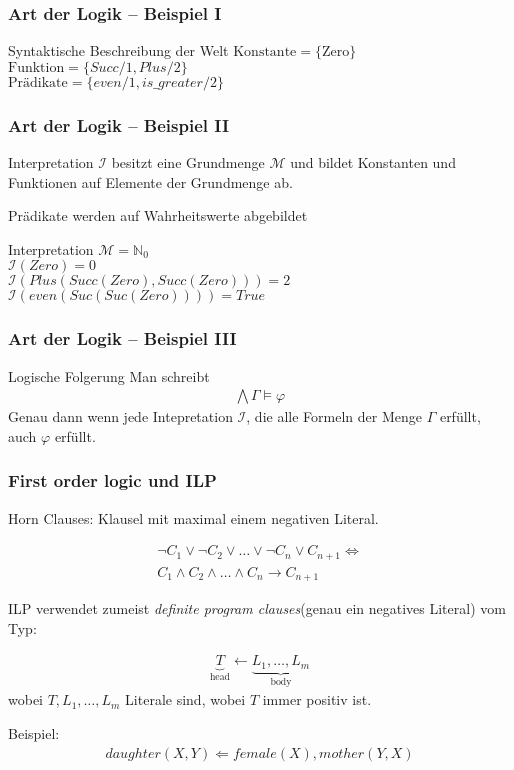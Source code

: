 \begin{frame}
	\frametitle{Art der Logik -- Beispiel I }

	\begin{block}{Syntaktische Beschreibung der Welt}
		$\text{Konstante} = \{\text{Zero}\}$\\
		$\text{Funktion} =\{Succ/1, Plus/2 \}$\\
		$\text{Prädikate} =\{even/1, is\_greater/2 \}$
	\end{block}

\end{frame}

\begin{frame}
	\frametitle{Art der Logik -- Beispiel II}
	Interpretation $\mathcal{I}$ besitzt eine Grundmenge $\mathcal{M}$
	und bildet Konstanten und Funktionen auf Elemente der Grundmenge ab.

	Prädikate werden auf Wahrheitswerte abgebildet

	\begin{block}{Interpretation}
			$\mathcal{M} = \mathbb{N}_0$\\
			$\mathcal{I}(Zero) = 0$\\
			$\mathcal{I}(Plus(Succ(Zero), Succ(Zero))) = 2$\\
			$\mathcal{I}(even(Suc(Suc(Zero)))) = True$
	\end{block}
\end{frame}

\begin{frame}
	\frametitle{Art der Logik -- Beispiel III}
	\begin{block}{Logische Folgerung}
		Man schreibt
		\begin{align*}
			 \bigwedge\Gamma \vDash \varphi
		\end{align*}
		Genau dann wenn jede Intepretation $\mathcal{I}$, die alle Formeln
		der Menge $\Gamma$ erfüllt, auch $\varphi$ erfüllt.
	\end{block}
\end{frame}

\begin{frame}
	\frametitle{First order logic und ILP}
	Horn Clauses: Klausel mit maximal einem negativen Literal.

	\begin{align*}
		\neg C_1 \vee \neg C_2 \vee \ldots \vee \neg C_n  \vee C_{n+1} \Leftrightarrow\\
		C_1 \wedge C_2 \wedge \ldots \wedge C_n  \rightarrow C_{n+1}
	\end{align*}

	ILP verwendet zumeist \textit{definite program clauses}(genau ein negatives Literal) vom Typ:

	\begin{align*}
		\underbrace{T}_{\text{head}} \leftarrow \underbrace{L_1, \ldots, L_m}_{\text{body}}
	\end{align*}
	wobei $T, L_1, \ldots, L_m$ Literale sind, wobei $T$ immer positiv ist.

	Beispiel:
	\begin{align*}
		daughter(X,Y) \Leftarrow female(X), mother(Y, X)
	\end{align*}
\end{frame}



